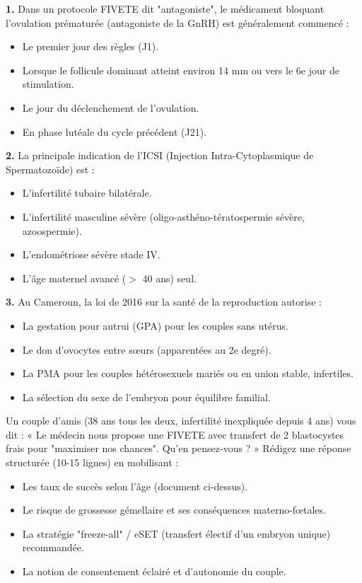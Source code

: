 \documentclass[11pt]{article}
\newcounter{popsec}
\newcounter{popsub}
\newcommand{\courssub}[1]{%
  \stepcounter{popsub}%
  \par\vspace{9pt}\noindent{\popxbold\fontsize{11.5}{13}\selectfont\color{popink}{\color{poporange}\thepopsec.\thepopsub}\hspace{6pt}#1}\par\nopagebreak\vspace{4pt}
}
\begin{document}
\courssub{Exercices d'entraînement}

\begin{exercice}
\textbf{1.} Dans un protocole FIVETE dit "antagoniste", le médicament bloquant l'ovulation prématurée (antagoniste de la GnRH) est généralement commencé :
\begin{itemize}
    \item[A.] Le premier jour des règles (J1).
    \item[B.] Lorsque le follicule dominant atteint environ 14 mm ou vers le 6e jour de stimulation.
    \item[C.] Le jour du déclenchement de l'ovulation.
    \item[D.] En phase lutéale du cycle précédent (J21).
\end{itemize}

\textbf{2.} La principale indication de l'ICSI (Injection Intra-Cytoplasmique de Spermatozoïde) est :
\begin{itemize}
    \item[A.] L'infertilité tubaire bilatérale.
    \item[B.] L'infertilité masculine sévère (oligo-asthéno-tératospermie sévère, azoospermie).
    \item[C.] L'endométriose sévère stade IV.
    \item[D.] L'âge maternel avancé ($>$ 40 ans) seul.
\end{itemize}

\textbf{3.} Au Cameroun, la loi de 2016 sur la santé de la reproduction autorise :
\begin{itemize}
    \item[A.] La gestation pour autrui (GPA) pour les couples sans utérus.
    \item[B.] Le don d'ovocytes entre sœurs (apparentées au 2e degré).
    \item[C.] La PMA pour les couples hétérosexuels mariés ou en union stable, infertiles.
    \item[D.] La sélection du sexe de l'embryon pour équilibre familial.
\end{itemize}
\end{exercice}

\begin{exercice}
Un couple d'amis (38 ans tous les deux, infertilité inexpliquée depuis 4 ans) vous dit : « Le médecin nous propose une FIVETE avec transfert de 2 blastocystes frais pour "maximiser nos chances". Qu'en pensez-vous ? »
Rédigez une réponse structurée (10-15 lignes) en mobilisant :
\begin{itemize}
    \item Les taux de succès selon l'âge (document ci-dessus).
    \item Le risque de grossesse gémellaire et ses conséquences materno-fœtales.
    \item La stratégie "freeze-all" / eSET (transfert électif d'un embryon unique) recommandée.
    \item La notion de consentement éclairé et d'autonomie du couple.
\end{itemize}
\end{exercice}
\end{document}
